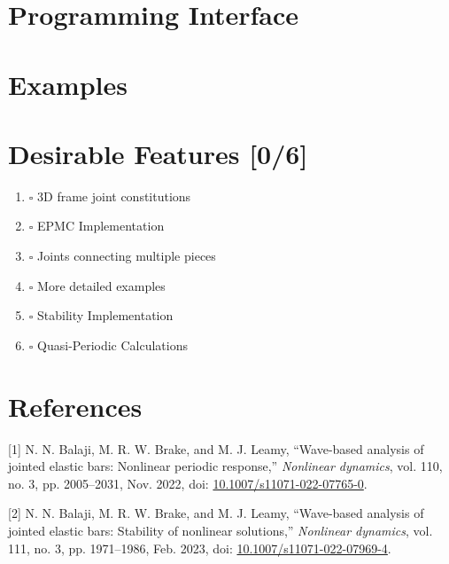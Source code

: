 \documentclass[11pt]{article}
\begin{document}
\section{Programming Interface}
\label{sec:org79688ac}
\section{Examples}
\label{sec:orgf3d0375}
\section{Desirable Features [0/6]}
\label{sec:org5d93483}
\begin{enumerate}
\item{$\square$} 3D frame joint constitutions
\item{$\square$} EPMC Implementation
\item{$\square$} Joints connecting multiple pieces
\item{$\square$} More detailed examples
\item{$\square$} Stability Implementation
\item{$\square$} Quasi-Periodic Calculations
\end{enumerate}
\section{References}
\label{sec:orga03becb}
\hypertarget{citeproc_bib_item_1}{[1] N. N. Balaji, M. R. W. Brake, and M. J. Leamy, “Wave-based analysis of jointed elastic bars: Nonlinear periodic response,” \textit{Nonlinear dynamics}, vol. 110, no. 3, pp. 2005–2031, Nov. 2022, doi: \href{https://doi.org/10.1007/s11071-022-07765-0}{10.1007/s11071-022-07765-0}.}

\hypertarget{citeproc_bib_item_2}{[2] N. N. Balaji, M. R. W. Brake, and M. J. Leamy, “Wave-based analysis of jointed elastic bars: Stability of nonlinear solutions,” \textit{Nonlinear dynamics}, vol. 111, no. 3, pp. 1971–1986, Feb. 2023, doi: \href{https://doi.org/10.1007/s11071-022-07969-4}{10.1007/s11071-022-07969-4}.}\bigskip
\end{document}
